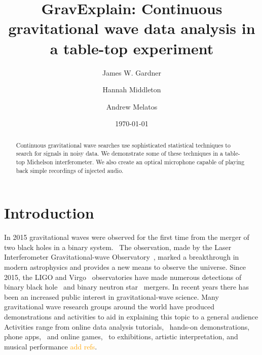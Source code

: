 \documentclass[prb,preprint]{revtex4-1}
\newcommand{\han}{\textcolor{orange}}
\begin{document}
\title{GravExplain: Continuous gravitational wave data analysis in a table-top experiment}

\author{James W. Gardner}

\author{Hannah Middleton}
\author{Andrew Melatos}

\date{\today}

\begin{abstract}
Continuous gravitational wave searches use sophisticated statistical techniques to search for signals in noisy data. We demonstrate some of these techniques in a table-top Michelson interferometer. We also create an optical microphone capable of playing back simple recordings of injected audio.
 
\end{abstract}

\maketitle


\section{Introduction}

In 2015 gravitational waves were observed for the first time from the merger of two black holes in a binary system.~\cite{GW150914} 
The observation, made by the Laser Interferometer Gravitational-wave Observatory~\citep[LIGO]{AdvancedLIGO:2015}, marked a breakthrough in modern astrophysics and provides a new means to observe the universe. 
Since 2015, the LIGO and Virgo~\cite{AdvancedVirgo:2015} observatories have made numerous detections of binary black hole~\cite{GW151226,GW170104,GW170814} and binary neutron star~\cite{GW170817,GW170817multi,GW190425} mergers. 
In recent years there has been an increased public interest in gravitational-wave science. 
Many gravitational wave research groups around the world have produced demonstrations and activities to aid in explaining this topic to a general audience
Activities range from online data analysis tutorials,~\cite{GWOSC:online,LOSC:2015} hands-on demonstrations, phone apps,~\cite{LaserLabs:online,SciVR:online} and online games,~\cite{BlackHoleHunter:online} to exhibitions,\cite{L2URSSE} artistic interpretation, and musical performance \han{add refs}. 
\end{document}
